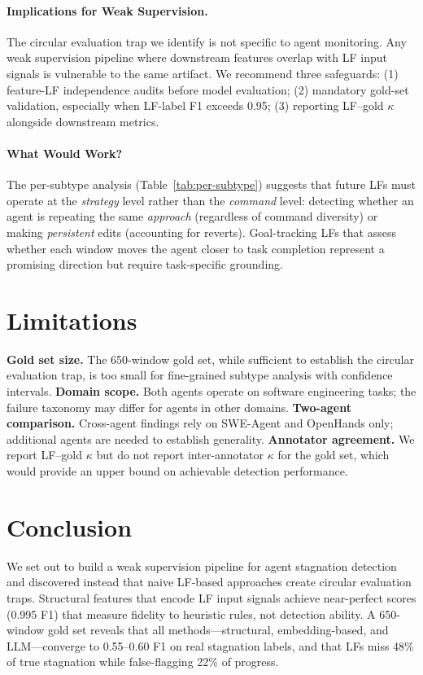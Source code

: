 \documentclass[11pt]{article}
\begin{document}
\paragraph{Implications for Weak Supervision.}
The circular evaluation trap we identify is not specific to agent monitoring. Any weak supervision pipeline where downstream features overlap with LF input signals is vulnerable to the same artifact. We recommend three safeguards: (1) feature-LF independence audits before model evaluation; (2) mandatory gold-set validation, especially when LF-label F1 exceeds 0.95; (3) reporting LF--gold $\kappa$ alongside downstream metrics.

\paragraph{What Would Work?}
The per-subtype analysis (Table~\ref{tab:per-subtype}) suggests that future LFs must operate at the \emph{strategy} level rather than the \emph{command} level: detecting whether an agent is repeating the same \emph{approach} (regardless of command diversity) or making \emph{persistent} edits (accounting for reverts). Goal-tracking LFs that assess whether each window moves the agent closer to task completion represent a promising direction but require task-specific grounding.

\section{Limitations}

\textbf{Gold set size.} The 650-window gold set, while sufficient to establish the circular evaluation trap, is too small for fine-grained subtype analysis with confidence intervals.
\textbf{Domain scope.} Both agents operate on software engineering tasks; the failure taxonomy may differ for agents in other domains.
\textbf{Two-agent comparison.} Cross-agent findings rely on SWE-Agent and OpenHands only; additional agents are needed to establish generality.
\textbf{Annotator agreement.} We report LF--gold $\kappa$ but do not report inter-annotator $\kappa$ for the gold set, which would provide an upper bound on achievable detection performance.

\section{Conclusion}

We set out to build a weak supervision pipeline for agent stagnation detection and discovered instead that naive LF-based approaches create circular evaluation traps. Structural features that encode LF input signals achieve near-perfect scores (0.995 F1) that measure fidelity to heuristic rules, not detection ability. A 650-window gold set reveals that all methods---structural, embedding-based, and LLM---converge to 0.55--0.60 F1 on real stagnation labels, and that LFs miss 48\% of true stagnation while false-flagging 22\% of progress.
\end{document}
